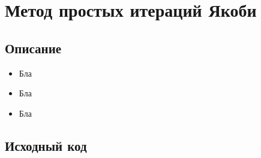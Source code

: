 \documentclass[../../report.tex]{subfiles}
\begin{document}
\chapter{Метод простых итераций Якоби}

\section{Описание}
\begin{itemize}
    \item Бла
    \item Бла
    \item Бла
\end{itemize}

\section{Исходный код}
\end{document}
